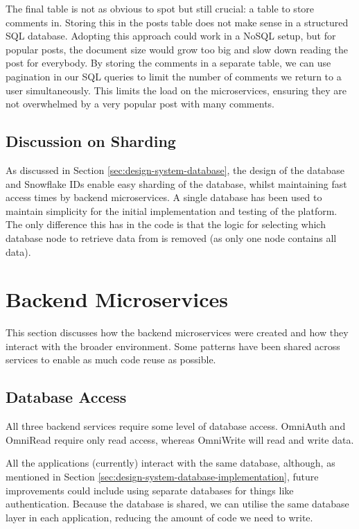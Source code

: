 The final table is not as obvious to spot but still crucial: a table to store comments in. Storing this in the posts table does not make sense in a structured SQL database.
Adopting this approach could work in a NoSQL setup, but for popular posts, the document size would grow too big and slow down reading the post for everybody.
By storing the comments in a separate table, we can use pagination in our SQL queries to limit the number of comments we return to a user simultaneously.
This limits the load on the microservices, ensuring they are not overwhelmed by a very popular post with many comments.

\subsection{Discussion on Sharding}
As discussed in Section \ref{sec:design-system-database}, the design of the database and Snowflake IDs enable easy sharding of the database, whilst maintaining fast access times by backend microservices.
A single database has been used to maintain simplicity for the initial implementation and testing of the platform. The only difference this has in the code is that the logic for selecting which database node to retrieve data from is removed (as only one node contains all data).


\section{Backend Microservices}
\label{sec:impl-backend}
This section discusses how the backend microservices were created and how they interact with the broader environment.
Some patterns have been shared across services to enable as much code reuse as possible.

\subsection{Database Access}
\label{sec:impl-backend-db}
All three backend services require some level of database access. OmniAuth and OmniRead require only read access, whereas OmniWrite will read and write data. 

All the applications (currently) interact with the same database, although, as mentioned in Section \ref{sec:design-system-database-implementation}, future improvements could include using separate databases for things like authentication.
Because the database is shared, we can utilise the same database layer in each application, reducing the amount of code we need to write.

